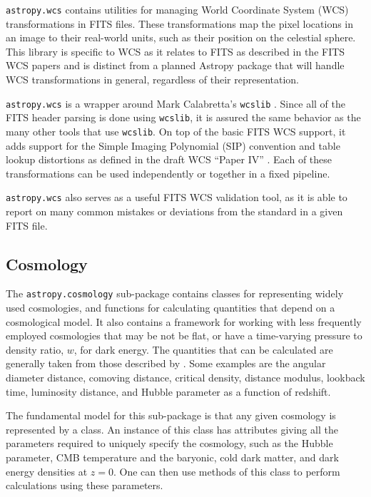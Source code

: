 \documentclass[traditabstract]{aa}
\begin{document}

\texttt{astropy.wcs} contains utilities for managing World Coordinate
System (WCS) transformations in FITS files.  These transformations map
the pixel locations in an image to their real-world units, such as
their position on the celestial sphere.  This library is specific to
WCS as it relates to FITS as described in the FITS WCS papers
\citep{greisen2002wcs,calabretta2002wcs,greisen2006wcs} and is
distinct from a planned Astropy package that will handle WCS
transformations in general, regardless of their representation.

\texttt{astropy.wcs} is a wrapper around Mark Calabretta's
\texttt{wcslib} \citep{calabretta2013wcslib}.  Since all of the FITS
header parsing is done using \texttt{wcslib}, it is assured the same
behavior as the many other tools that use \texttt{wcslib}.  On top of
the basic FITS WCS support, it adds support for the Simple Imaging
Polynomial (SIP) convention and table lookup distortions as defined in
the draft WCS ``Paper IV'' \citep{calabretta2004wcs}.  Each of these
transformations can be used independently or together in a fixed
pipeline.

\texttt{astropy.wcs} also serves as a useful FITS WCS validation tool,
as it is able to report on many common mistakes or deviations from the
standard in a given FITS file.

\subsection{Cosmology}


The \texttt{astropy.cosmology} sub-package contains classes for
representing widely used cosmologies, and functions for calculating
quantities that depend on a cosmological model. It also contains a
framework for working with less frequently employed cosmologies that
may be not be flat, or have a time-varying pressure to density ratio,
$w$, for dark energy. The quantities that can be calculated are
generally taken from those described by \citet{Hogg99}. Some examples
are the angular diameter distance, comoving distance, critical
density, distance modulus, lookback time, luminosity distance, and
Hubble parameter as a function of redshift.

The fundamental model for this sub-package is that any given cosmology
is represented by a class. An instance of this class has attributes
giving all the parameters required to uniquely specify the cosmology,
such as the Hubble parameter, CMB temperature and the baryonic, cold
dark matter, and dark energy densities at $z=0$. One can then use
methods of this class to perform calculations using these parameters.
\end{document}
